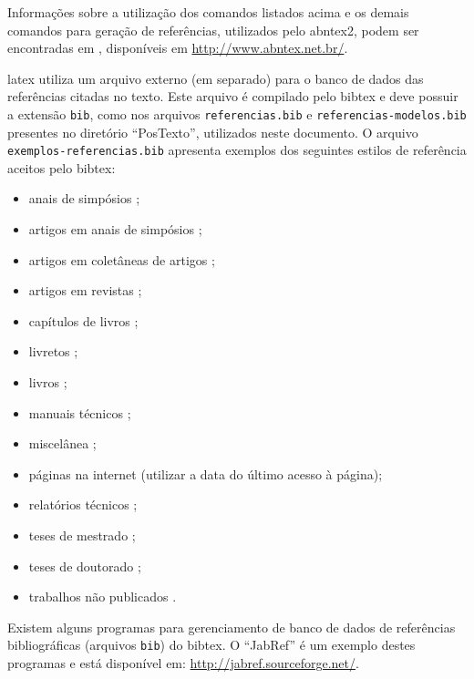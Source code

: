 Informações sobre a utilização dos comandos listados acima e os demais comandos para geração de referências, utilizados pelo \gls{abntex2}, podem ser encontradas em , disponíveis em \url{http://www.abntex.net.br/}.

\gls{latex} utiliza um arquivo externo (em separado) para o banco de dados das referências citadas no texto. Este arquivo é compilado pelo \gls{bibtex} e deve possuir a extensão \texttt{bib}, como nos arquivos \texttt{referencias.bib} e \texttt{referencias-modelos.bib} presentes no diretório ``PosTexto'', utilizados neste documento. O arquivo \texttt{exemplos-referencias.bib} apresenta exemplos dos seguintes estilos de referência aceitos pelo \gls{bibtex}:

\begin{itemize}%
\item anais de simpósios \citep{Alt1995,Pirmez2002};
\item artigos em anais de simpósios \citep{Faina2001};
\item artigos em coletâneas de artigos \citep{Pinto2000};
\item artigos em revistas \citep{Guimaraes2003};
\item capítulos de livros \citep{Santos2000};
\item livretos \citep{Thompson2001};
\item livros \citep{Pedrycz1998};
\item manuais técnicos \citep{IONA1999};
\item miscelânea \citep{Cruz2003};
\item páginas na internet \cite[acessado em 1 de janeiro de 2004]{Larsson2003} (utilizar a data do último acesso à página);
\item relatórios técnicos \citep{OMG2000};
\item teses de mestrado \citep{SantosFilho2003};
\item teses de doutorado \citep{Faina2000};
\item trabalhos não publicados \citep{Sichman2002}.
\end{itemize}

Existem alguns programas para gerenciamento de banco de dados de referências bibliográficas (arquivos \texttt{bib}) do \gls{bibtex}. O ``JabRef'' é um exemplo destes programas e está disponível em: \url{http://jabref.sourceforge.net/}.

